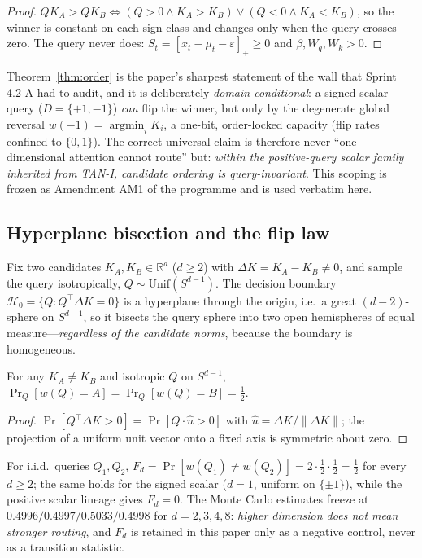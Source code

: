 \begin{proof}
$QK_A>QK_B\iff (Q>0 \wedge K_A>K_B)\vee(Q<0\wedge K_A<K_B)$, so the winner
is constant on each sign class and changes only when the query crosses
zero. The \TAN{} query never does: $S_t=[x_t-\mu_t-\varepsilon]_+\ge0$ and
$\beta,W_q,W_k>0$.
\end{proof}

Theorem~\ref{thm:order} is the paper's sharpest statement of the wall that
Sprint 4.2-A had to audit, and it is deliberately \emph{domain-conditional}:
a signed scalar query ($D=\{+1,-1\}$) \emph{can} flip the winner, but only
by the degenerate global reversal $w(-1)=\operatorname{argmin}_iK_i$, a
one-bit, order-locked capacity (flip rates confined to $\{0,1\}$). The
correct universal claim is therefore never ``one-dimensional attention
cannot route'' but: \emph{within the positive-query scalar family inherited
from TAN-I, candidate ordering is query-invariant}. This scoping is frozen
as Amendment AM1 of the programme and is used verbatim here.

\subsection{Hyperplane bisection and the flip law}
\label{sec:bisection}

Fix two candidates $K_A,K_B\in\mathbb{R}^d$ ($d\ge2$) with
$\Delta K=K_A-K_B\neq0$, and sample the query isotropically,
$Q\sim\mathrm{Unif}(S^{d-1})$. The decision boundary
$\mathcal{H}_0=\{Q:Q^{\top}\Delta K=0\}$ is a hyperplane through the
origin, i.e.\ a great $(d-2)$-sphere on $S^{d-1}$, so it bisects the query
sphere into two open hemispheres of equal measure---\emph{regardless of the
candidate norms}, because the boundary is homogeneous.

\begin{proposition}
\label{prop:bisection}
For any $K_A\neq K_B$ and isotropic $Q$ on $S^{d-1}$,
$\Pr_Q[w(Q)=A]=\Pr_Q[w(Q)=B]=\tfrac12$.
\end{proposition}

\begin{proof}
$\Pr[Q^{\top}\Delta K>0]=\Pr[Q\cdot\hat u>0]$ with
$\hat u=\Delta K/\|\Delta K\|$; the projection of a uniform unit vector
onto a fixed axis is symmetric about zero.
\end{proof}

\begin{corollary}
\label{cor:fd}
For i.i.d.\ queries $Q_1,Q_2$,
$F_d=\Pr[w(Q_1)\neq w(Q_2)]=2\cdot\tfrac12\cdot\tfrac12=\tfrac12$ for
every $d\ge2$; the same holds for the signed scalar ($d=1$, uniform on
$\{\pm1\}$), while the positive scalar lineage gives $F_d=0$. The Monte
Carlo estimates freeze at $0.4996/0.4997/0.5033/0.4998$ for
$d=2,3,4,8$: \emph{higher dimension does not mean stronger routing}, and
$F_d$ is retained in this paper only as a negative control, never as a
transition statistic.
\end{corollary}

